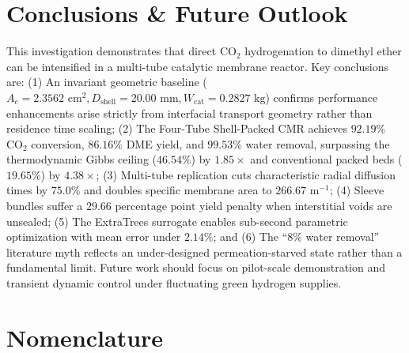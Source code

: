 \documentclass[12pt,a4paper]{article}
\begin{document}
\section{Conclusions \& Future Outlook}
This investigation demonstrates that direct $\text{CO}_2$ hydrogenation to dimethyl ether can be intensified in a multi-tube catalytic membrane reactor. Key conclusions are: (1) An invariant geometric baseline ($A_c = 2.3562\text{ cm}^2, D_{\text{shell}} = 20.00\text{ mm}, W_{\text{cat}} = 0.2827\text{ kg}$) confirms performance enhancements arise strictly from interfacial transport geometry rather than residence time scaling; (2) The Four-Tube Shell-Packed CMR achieves $92.19\%$ $\text{CO}_2$ conversion, $86.16\%$ DME yield, and $99.53\%$ water removal, surpassing the thermodynamic Gibbs ceiling ($46.54\%$) by $1.85\times$ and conventional packed beds ($19.65\%$) by $4.38\times$; (3) Multi-tube replication cuts characteristic radial diffusion times by $75.0\%$ and doubles specific membrane area to $266.67\text{ m}^{-1}$; (4) Sleeve bundles suffer a $29.66\text{ percentage point}$ yield penalty when interstitial voids are unsealed; (5) The ExtraTrees surrogate enables sub-second parametric optimization with mean error under $2.14\%$; and (6) The ``8\% water removal'' literature myth reflects an under-designed permeation-starved state rather than a fundamental limit. Future work should focus on pilot-scale demonstration and transient dynamic control under fluctuating green hydrogen supplies.

\section*{Nomenclature}
\end{document}
